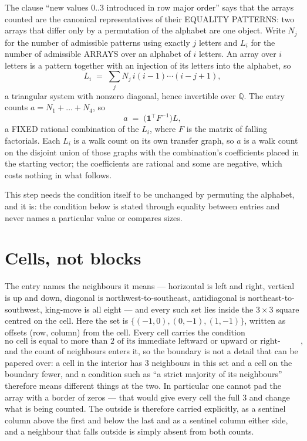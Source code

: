 \documentclass[11pt,a4paper]{article}
\theoremstyle{plain}
\theoremstyle{definition}
\begin{document}
The clause ``new values $0..3$ introduced in row major order'' says that the arrays
counted are the canonical representatives of their EQUALITY PATTERNS: two arrays that differ
only by a permutation of the alphabet are one object. Write $N_j$ for the number of admissible
patterns using exactly $j$ letters and $L_i$ for the number of admissible ARRAYS over an
alphabet of $i$ letters. An array over $i$ letters is a pattern together with an injection of
its letters into the alphabet, so
\[
L_i\;=\;\sum_{j}N_j\,i(i-1)\cdots(i-j+1),
\]
a triangular system with nonzero diagonal, hence invertible over $\mathbb{Q}$. The entry
counts $a=N_1+\dots+N_{4}$, so
\[
a\;=\;\bigl(\mathbf{1}^{\!\top}F^{-1}\bigr)L ,
\]
a FIXED rational combination of the $L_i$, where $F$ is the matrix of falling factorials.
Each $L_i$ is a walk count on its own transfer graph, so $a$ is a walk count on the disjoint
union of those graphs with the combination's coefficients placed in the starting vector; the
coefficients are rational and some are negative, which costs nothing in what follows.

This step needs the condition itself to be unchanged by permuting the alphabet, and it is:
the condition below is stated through equality between entries and never names a particular
value or compares sizes.

\section{Cells, not blocks}

The entry names the neighbours it means --- horizontal is left and right, vertical is up and
down, diagonal is northwest-to-southeast, antidiagonal is northeast-to-southwest, king-move is
all eight --- and every such set lies inside the $3\times3$ square centred on the cell. Here
the set is $\{(-1,0), (0,-1), (1,-1)\}$, written as offsets (row, column) from the cell. Every cell carries
the condition
\[
\text{no cell is equal to more than 2 of its immediate leftward or upward or right-upward antidiagonal neighbours},
\]
and the count of neighbours enters it, so the boundary is not a detail that can be papered
over: a cell in the interior has $3$ neighbours in this set and a cell on the boundary
fewer, and a condition such as ``a strict majority of its neighbours'' therefore means
different things at the two. In particular one cannot pad the array with a border of zeros ---
that would give every cell the full $3$ and change what is being counted. The outside is
therefore carried
explicitly, as a sentinel column above the first and below the last and as a sentinel column
either side, and a neighbour that falls outside is simply absent from both counts.
\end{document}
